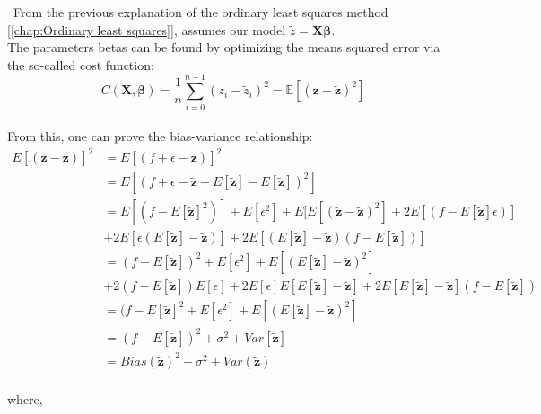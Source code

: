 \quad \, From the previous explanation of the ordinary least squares method [\ref{chap:Ordinary least squares}], assumes our model $\tilde{z} = \textbf{X}\boldsymbol{\beta}$. \\

The parameters betas can be found by optimizing the means squared error via the so-called cost function: \\

$$C(\boldsymbol{X},\boldsymbol{\beta}) =\frac{1}{n}\sum_{i=0}^{n-1}(z_i-\tilde{z}_i)^2=\mathbb{E}\left[(\boldsymbol{z}-\boldsymbol{\tilde{z}})^2\right]$$ \\

From this, one can prove the bias-variance relationship: \\

\begin{align*}
\label{bias-variance-decomposition}
E[(\boldsymbol{z} - \boldsymbol{\tilde{z}})]^{2} &= E[(f + \epsilon - \boldsymbol{\tilde{z}})]^{2}\\ &= E[(f + \epsilon - \boldsymbol{\tilde{z}} + E[\boldsymbol{\tilde{z}}] - E[\boldsymbol{\tilde{z}}])^{2}]\\ &= E[(f - E[\boldsymbol{\tilde{z}}]^{2})] + E[\epsilon^{2}] + E[E[(\boldsymbol{\tilde{z}} - \boldsymbol{\tilde{z}})^{2}] + 2E[(f - E[\boldsymbol{\tilde{z}}] \epsilon)]\\ &+ 2E[\epsilon(E[\boldsymbol{\tilde{z}}] - \boldsymbol{\tilde{z}})] + 2E[(E[\boldsymbol{\tilde{z}}] - \boldsymbol{\tilde{z}})(f-E[\boldsymbol{\tilde{z}}])]\\ &= (f - E[\boldsymbol{\tilde{z}}])^{2} + E[\epsilon^{2}] + E[(E[\boldsymbol{\tilde{z}}] - \boldsymbol{\tilde{z}})^{2}]\\ &+ 2(f-E[\boldsymbol{\tilde{z}}])E[\epsilon] + 2E[\epsilon]E[E[\boldsymbol{\tilde{z}}]-\boldsymbol{\tilde{z}}] + 2E[E[\boldsymbol{\tilde{z}}]-\boldsymbol{\tilde{z}}](f-E[\boldsymbol{\tilde{z}}])\\ &= (f-E[\boldsymbol{\tilde{z}}]^{2} + E[\epsilon^{2}] + E[(E[\boldsymbol{\tilde{z}}] - \boldsymbol{\tilde{z}})^{2}]\\ &= (f-E[\boldsymbol{\tilde{z}}])^{2} + \sigma^{2} + Var[\boldsymbol{\tilde{z}}]\\ &= Bias(\boldsymbol{\tilde{z}})^{2} + \sigma^{2} + Var(\boldsymbol{\tilde{z}})
\end{align*}\\

\noindent where, \\

